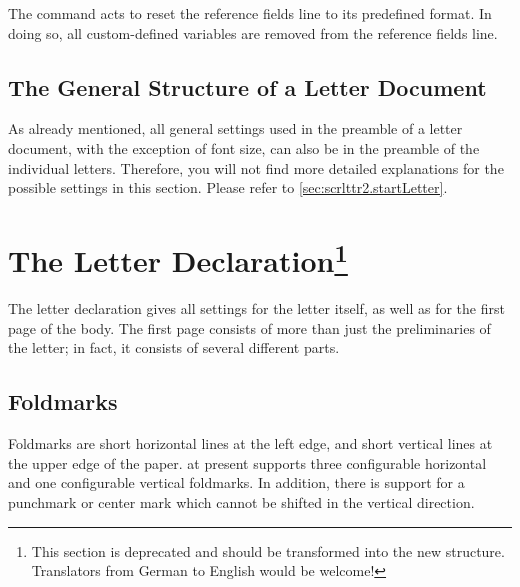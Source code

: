 The command  acts to reset the reference
fields line to its predefined format. In doing so, all custom-defined
variables are removed from the reference fields line.
%
%
%
%
%


\subsection{The General Structure of a Letter Document}
\label{sec:scrlttr2.document}

As already mentioned, all general settings used in the preamble of a
letter document, with the exception of font size, can also be in the
preamble of the individual letters. Therefore, you will not find more
detailed explanations for the possible settings in this
section. Please refer to \autoref{sec:scrlttr2.startLetter}.


\section{The Letter Declaration\protect\footnote{This section is
  deprecated and should be transformed into the new structure. Translators
  from German to English would be welcome!}}
\label{sec:scrlttr2.startLetter}

The letter declaration gives all settings for the letter itself, as
well as for the first page of the body. The first page consists of
more than just the preliminaries of the letter; in fact, it consists
of several different parts.


\subsection{Foldmarks}
\label{sec:scrlttr2.foldmarks}
%

Foldmarks are short horizontal lines at the left edge,
and short vertical lines at the upper edge of the paper. \KOMAScript{}
at present supports three configurable horizontal and one configurable
vertical foldmarks. In addition, there is support for a punchmark or
center mark which cannot be shifted in the vertical direction.

